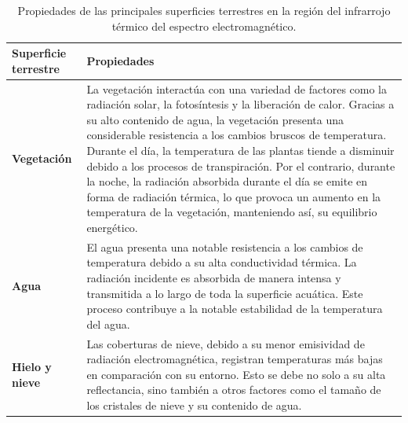 \begin{table}[H]
    \caption{Propiedades de las principales superficies terrestres en la región del infrarrojo térmico del espectro electromagnético.}
    \small
    \begin{tabularx}{1\textwidth}{lX}
        \hline
        \textbf{Superficie terrestre} & \textbf{Propiedades}                                                                                                                                                                                                                                                                                                                                                                                                                                                                                                                                                                        \\ \hline
        \textbf{Vegetación}           & La vegetación interactúa con una variedad de factores como la radiación solar, la fotosíntesis y la liberación de calor. Gracias a su alto contenido de agua, la vegetación presenta una considerable resistencia a los cambios bruscos de temperatura. Durante el día, la temperatura de las plantas tiende a disminuir debido a los procesos de transpiración. Por el contrario, durante la noche, la radiación absorbida durante el día se emite en forma de radiación térmica, lo que provoca un aumento en la temperatura de la vegetación, manteniendo así, su equilibrio energético. \\  \hline
        \textbf{Agua}                 & El agua presenta una notable resistencia a los cambios de temperatura debido a su alta conductividad térmica. La radiación incidente es absorbida de manera intensa y transmitida a lo largo de toda la superficie acuática. Este proceso contribuye a la notable estabilidad de la temperatura del agua.                                                                                                                                                                                                                                                                                   \\  \hline
        \textbf{Hielo y nieve}        & Las coberturas de nieve, debido a su menor emisividad de radiación electromagnética, registran temperaturas más bajas en comparación con su entorno. Esto se debe no solo a su alta reflectancia, sino también a otros factores como el tamaño de los cristales de nieve y su contenido de agua.                                                                                                                                                                                                                                                                                            \\  \hline
    \end{tabularx}
    \begin{minipage}{\textwidth}
        \vspace{10pt}
        \label{tab:PropiedadesTIR}
    \end{minipage}
\end{table}

